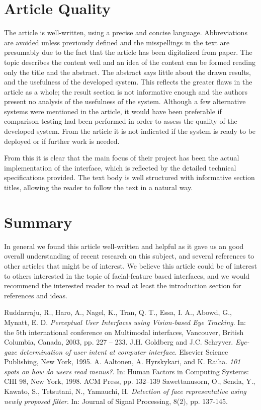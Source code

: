 \documentclass[a4paper,10pt]{article}
\begin{document}
\section{Article Quality}
The article is well-written, using a precise and concise language. Abbreviations are avoided unless previously defined and the misspellings in the text are presumably due to the fact that the article has been digitalized from paper. The topic describes the content well and an idea of the content can be formed reading only the title and the abstract. The abstract says little about the drawn results, and the usefulness of the developed system. This reflects the greater flaws in the article as a whole; the result section is not informative enough and the authors present no analysis of the usefulness of the system. Although a few alternative systems were mentioned in the article, it would have been preferable if comparison testing had been performed in order to assess the quality of the developed system. From the article it is not indicated if the system is ready to be deployed or if further work is needed.

From this it is clear that the main focus of their project has been the actual implementation of the interface, which is reflected by the detailed technical specifications provided. The text body is well structured with informative section titles, allowing the reader to follow the text in a natural way.


\section{Summary}
In general we found this article well-written and helpful as it gave us an good overall understanding of recent research on this subject, and several references to other articles that might be of interest. We believe this article could be of interest to others interested in the topic of facial-feature based interfaces, and we would recommend the interested reader to read at least the introduction section for references and ideas.



\begin{thebibliography}{4}
 Ruddarraju, R., Haro, A., Nagel, K., Tran, Q. T., Essa, I. A., Abowd, G., Mynatt, E. D. \emph{Perceptual User Interfaces using Vision-based Eye Tracking}. In: the 5th international conference on Multimodal interfaces, Vancouver, British Columbia, Canada, 2003, pp. 227 – 233.
 J.H. Goldberg and J.C. Schryver. \emph{Eye-gaze determination of user intent at computer interface}. Elsevier Science Publishing, New York, 1995.
 A. Aaltonen, A. Hyrskykari, and K. Raiha. \emph{101 spots on how do users read menus?}. In: Human Factors in Computing Systems: CHI 98, New York, 1998. ACM Press, pp. 132–139
 Sawettanusorn, O., Senda, Y., Kawato, S., Tetsutani, N., Yamauchi, H. \emph{Detection of face representative using newly proposed filter}. In: Journal of Signal Processing, 8(2), pp. 137-145.

\end{thebibliography}
\end{document}
